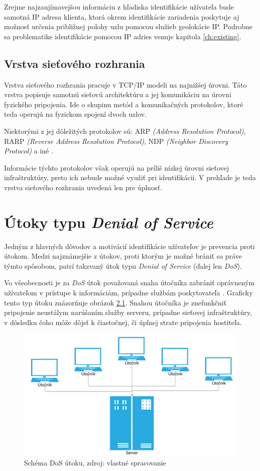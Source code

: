 \documentclass[
  printed, %
  table,   %
  lof,     %
  nolot,   %
  nocover
]{fithesis3}
\begin{document}
Zrejme najzaujímavejšou informáciu z hľadiska identifikácie užívateľa bude samotná IP
adresa klienta, ktorá okrem identifikácie zariadenia poskytuje aj možnosť určenia
približnej polohy uzlu pomocou služieb geolokácie IP. Podrobne sa problematike
identifikácie pomocou IP adries venuje kapitola \ref{ch:existing}. 

\section{Vrstva sieťového rozhrania}
Vrstva sieťového rozhrania pracuje v TCP/IP modeli na najnižšej úrovni.
Táto vrstva popisuje samotnú sieťovú architektúru a jej komunikáciu na úrovni
fyzického pripojenia. Ide o skupinu metód a komunikačných protokolov, ktoré 
teda operujú na fyzickom spojení dvoch uzlov.

Niektorými z jej dôležitých protokolov sú: ARP
\textit{(Address Resolution Protocol)}, RARP
\textit{(Reverse Address Resolution Protocol)},
NDP \textit{(Neighbor Discovery Protocol)} a iné \cite{rfc1123}.

Informácie týchto protokolov však operujú na príliš nízkej úrovni sieťovej
infraštruktúry, preto ich nebude možné využiť pri identifikácii. V prehľade je 
teda vrstva sieťového rozhrania uvedená len pre úplnosť.

\chapter{Útoky typu \textit{Denial of Service}}
\label{ch:dos}
Jedným z hlavných dôvodov a motivácií identifikácie užívateľov je prevencia
proti útokom. Medzi najznámejšie z útokov, proti ktorým je možné brániť sa
práve týmto spôsobom, patrí takzvaný útok typu \textit{Denial of Service}
(ďalej len \textit{DoS}).

Vo všeobecnosti je za \textit{DoS} útok považovaná snaha útočníka zabrániť
oprávneným užívateľom v prístupe k informáciám, prípadne službám poskytovateľa \cite{McDowell:DoS}.
Graficky tento typ útoku znázorňuje obrázok \ref{fig:dos}.
Snahou útočníka je znefunkčniť pripojenie neustálym narúšaním služby serveru,
prípadne sieťovej infraštruktúry, v dôsledku čoho môže dôjsť k čiastočnej, či
úplnej strate pripojenia hostiteľa. 

\begin{figure}[h]
  \centering
    \includegraphics[width=\textwidth]{images/dos.png}
  \caption{Schéma DoS útoku, zdroj: vlastné spracovanie}
  \label{fig:dos}
\end{figure}
\end{document}

